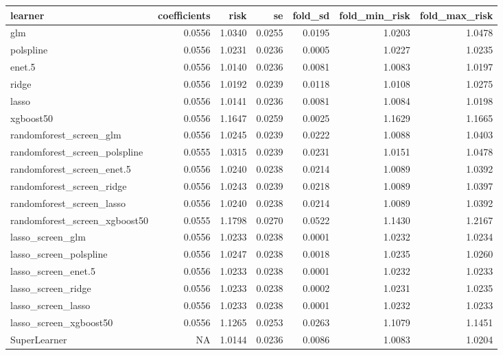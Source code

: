 \documentclass[
  12pt, krantz2,
]{krantz}
\theoremstyle{definition}
\theoremstyle{definition}
\theoremstyle{definition}
\newcommand{\1}{\mathbbm{1}}
\begin{document}
\begin{table}
\centering
\begin{tabular}{l|r|r|r|r|r|r}
\hline
learner & coefficients & risk & se & fold\_sd & fold\_min\_risk & fold\_max\_risk\\
\hline
glm & 0.0556 & 1.0340 & 0.0255 & 0.0195 & 1.0203 & 1.0478\\
\hline
polspline & 0.0556 & 1.0231 & 0.0236 & 0.0005 & 1.0227 & 1.0235\\
\hline
enet.5 & 0.0556 & 1.0140 & 0.0236 & 0.0081 & 1.0083 & 1.0197\\
\hline
ridge & 0.0556 & 1.0192 & 0.0239 & 0.0118 & 1.0108 & 1.0275\\
\hline
lasso & 0.0556 & 1.0141 & 0.0236 & 0.0081 & 1.0084 & 1.0198\\
\hline
xgboost50 & 0.0556 & 1.1647 & 0.0259 & 0.0025 & 1.1629 & 1.1665\\
\hline
randomforest\_screen\_glm & 0.0556 & 1.0245 & 0.0239 & 0.0222 & 1.0088 & 1.0403\\
\hline
randomforest\_screen\_polspline & 0.0555 & 1.0315 & 0.0239 & 0.0231 & 1.0151 & 1.0478\\
\hline
randomforest\_screen\_enet.5 & 0.0556 & 1.0240 & 0.0238 & 0.0214 & 1.0089 & 1.0392\\
\hline
randomforest\_screen\_ridge & 0.0556 & 1.0243 & 0.0239 & 0.0218 & 1.0089 & 1.0397\\
\hline
randomforest\_screen\_lasso & 0.0556 & 1.0240 & 0.0238 & 0.0214 & 1.0089 & 1.0392\\
\hline
randomforest\_screen\_xgboost50 & 0.0555 & 1.1798 & 0.0270 & 0.0522 & 1.1430 & 1.2167\\
\hline
lasso\_screen\_glm & 0.0556 & 1.0233 & 0.0238 & 0.0001 & 1.0232 & 1.0234\\
\hline
lasso\_screen\_polspline & 0.0556 & 1.0247 & 0.0238 & 0.0018 & 1.0235 & 1.0260\\
\hline
lasso\_screen\_enet.5 & 0.0556 & 1.0233 & 0.0238 & 0.0001 & 1.0232 & 1.0233\\
\hline
lasso\_screen\_ridge & 0.0556 & 1.0233 & 0.0238 & 0.0002 & 1.0231 & 1.0235\\
\hline
lasso\_screen\_lasso & 0.0556 & 1.0233 & 0.0238 & 0.0001 & 1.0232 & 1.0233\\
\hline
lasso\_screen\_xgboost50 & 0.0556 & 1.1265 & 0.0253 & 0.0263 & 1.1079 & 1.1451\\
\hline
SuperLearner & NA & 1.0144 & 0.0236 & 0.0086 & 1.0083 & 1.0204\\
\hline
\end{tabular}
\end{table}
\end{document}
